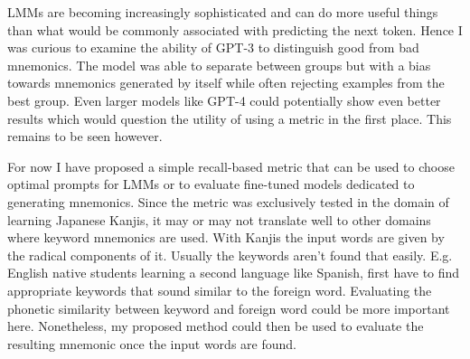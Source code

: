 LMMs are becoming increasingly sophisticated and can do more useful things than what would be commonly associated with predicting the next token. Hence I was curious to examine the ability of GPT-3 to distinguish good from bad mnemonics. The model was able to separate between groups but with a bias towards mnemonics generated by itself while often rejecting examples from the best group. Even larger models like GPT-4 could potentially show even better results which would question the utility of using a metric in the first place. This remains to be seen however.

For now I have proposed a simple recall-based metric that can be used to choose optimal prompts for LMMs or to evaluate fine-tuned models dedicated to generating mnemonics. Since the metric was exclusively tested in the domain of learning Japanese Kanjis, it may or may not translate well to other domains where keyword mnemonics are used. With Kanjis the input words are given by the radical components of it. Usually the keywords aren't found that easily. E.g. English native students learning a second language like Spanish, first have to find appropriate keywords that sound similar to the foreign word. Evaluating the phonetic similarity between keyword and foreign word could be more important here. Nonetheless, my proposed method could then be used to evaluate the resulting mnemonic once the input words are found.   

